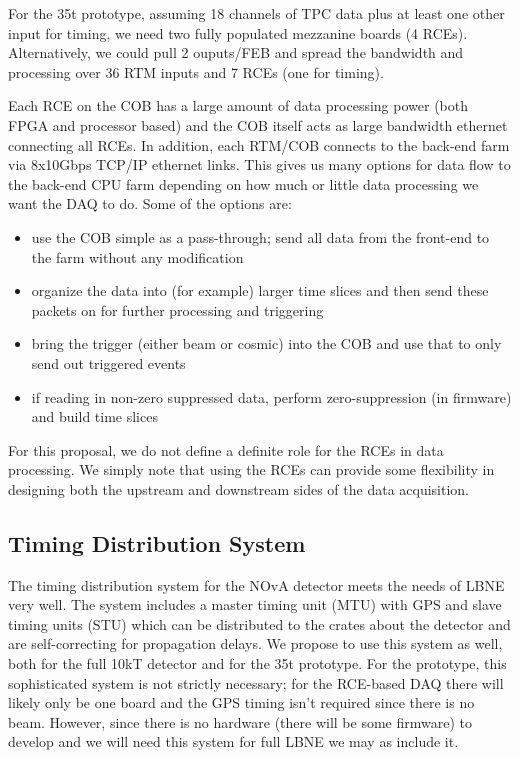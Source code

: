 For the 35t prototype, assuming 18 channels of TPC data plus at least one other input for timing, we need two fully populated mezzanine boards (4 RCEs).  Alternatively, we could pull 2 ouputs/FEB and spread the bandwidth and processing over 36 RTM inputs and 7 RCEs (one for timing). 


Each RCE on the COB has a large amount of data processing power (both FPGA and processor based) and the COB itself acts as large bandwidth ethernet connecting all RCEs.  In addition, each RTM/COB connects to the back-end farm via 8x10Gbps TCP/IP ethernet links.  This gives us many options for data flow to the back-end CPU farm depending on how much or little data processing we want the DAQ to do.  Some of the options are:
\begin{itemize}
\item use the COB simple as a pass-through; send all data from the front-end to the farm without any modification
\item organize the data into (for example) larger time slices and then send these packets on for further processing and triggering
\item bring the trigger (either beam or cosmic) into the COB and use that to only send out triggered events
\item if reading in non-zero suppressed data, perform zero-suppression (in firmware) and build time slices
\end{itemize}
For this proposal, we do not define a definite role for the RCEs in data processing.  We simply note that using the RCEs can provide some flexibility in designing both the upstream and downstream sides of the data acquisition.  


\subsection{Timing Distribution System}

The timing distribution system for the NOvA detector\cite{Ayres:2007tu} meets the needs of LBNE very well.  The system includes a master timing unit (MTU) with GPS and slave timing units (STU) which can be distributed to the crates about the detector and are self-correcting for propagation delays.  We propose  to use this system as well, both for the full 10kT detector and for the 35t prototype.  For the prototype, this sophisticated system is not strictly necessary; for the RCE-based DAQ there will likely only be one board and the GPS timing isn't required since there is no beam.  However, since there is no hardware (there will be some firmware) to develop and we will need this system for full LBNE we may as include it. 

